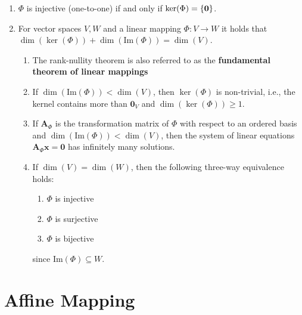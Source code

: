 \begin{enumerate}
    \item $\Phi$ is injective (one-to-one) if and only if $\ker(\Phi) = \left\{\bm{0}\right\}$.
    \hfill \cite{mfml/book/mml/Deisenroth-Faisal-Ong}

    \item
    \begin{theorem}
        For vector spaces $V, W$ and a linear mapping $\Phi : V \to W$ it holds that $\dim(\ker(\Phi)) + \dim(\text{Im}(\Phi)) = \dim(V )$.
        \hfill \cite{mfml/book/mml/Deisenroth-Faisal-Ong}
    \end{theorem}
    \begin{enumerate}
        \item The rank-nullity theorem is also referred to as the \textbf{fundamental theorem of linear mappings}
        \hfill \cite{mfml/book/mml/Deisenroth-Faisal-Ong}

        \item If $\dim(\text{Im}(\Phi )) < \dim(V )$, then $\ker(\Phi)$ is non-trivial, i.e., the kernel contains more than $\bm{0}_V$ and $\dim(\ker(\Phi)) \geq 1$.
        \hfill \cite{mfml/book/mml/Deisenroth-Faisal-Ong}

        \item If $\bm{A}_\Phi $ is the transformation matrix of $\Phi$  with respect to an ordered basis and $\dim(\text{Im}(\Phi )) < \dim(V )$, then the system of linear equations $\bm{A}_\Phi \bm{x} = \bm{0}$ has infinitely many solutions.
        \hfill \cite{mfml/book/mml/Deisenroth-Faisal-Ong}

        \item If $\dim(V ) = \dim(W)$, then the following three-way equivalence holds:
        \begin{enumerate}
            \item $\Phi$ is injective
            \item $\Phi$ is surjective
            \item $\Phi$ is bijective
        \end{enumerate}
        since $\text{Im}(\Phi) \subseteq W$.
    \end{enumerate}
\end{enumerate}













\section{Affine Mapping}

